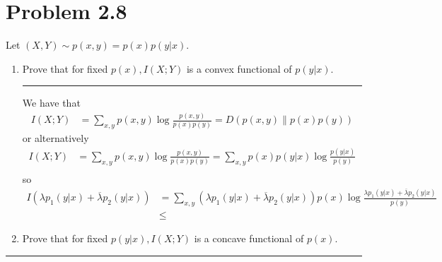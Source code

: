 \documentclass{article}
\newcommand{\horline}
           {\begin{center}
              \noindent\rule{8cm}{0.4pt}
            \end{center}}
\begin{document}
\section*{Problem 2.8}
Let $(X,Y) \sim p(x,y) = p(x)p(y|x)$.
\begin{enumerate}[label=\alph*)]
  \item{Prove that for fixed $p(x), I(X;Y)$ is a convex functional of 
        $p(y|x)$.
        \horline
        We have that
        \begin{align*}
        I(X;Y) &= \sum_{x,y} p(x,y) \log \frac{p(x,y)}{p(x)p(y)} 
                = D(p(x,y) \| p(x)p(y))
        \end{align*}
        or alternatively
        \begin{align*}
         I(X ; Y) &= \sum_{x,y} p(x,y) \log \frac{p(x,y)}{p(x)p(y)} 
                   = \sum_{x,y} p(x)p(y|x) \log \frac{p(y|x)}{p(y)}\\
        \end{align*}
        so
        \begin{align*}
        I(\lambda p_1(y|x) + \overline{\lambda}p_2(y|x)) &=
        \sum_{x,y} (\lambda p_1(y|x) 
                    + \overline{\lambda}p_2(y|x))p(x) 
                   \log \frac{\lambda p_1(y|x) + \overline{\lambda}p_2(y|x)}
                             {p(y)} \\
          & \leq 
        \end{align*}
       }
  \item{Prove that for fixed $p(y|x), I(X;Y)$ is a concave functional of
        $p(x)$.
       }
\end{enumerate}
\horline
\end{document}

